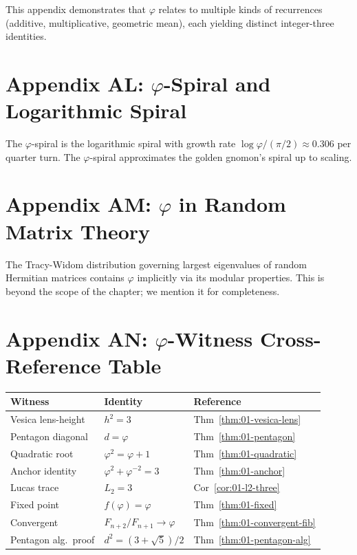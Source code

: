 \begin{remark}
This appendix demonstrates that $\varphi$ relates to multiple kinds
of recurrences (additive, multiplicative, geometric mean), each
yielding distinct integer-three identities.
\end{remark}

\section*{Appendix AL: $\varphi$-Spiral and Logarithmic Spiral}
\label{fa_01:sec:01-app-AL}

The $\varphi$-spiral is the logarithmic spiral with growth rate
$\log \varphi / (\pi/2) \approx 0.306$ per quarter turn. The
$\varphi$-spiral approximates the golden gnomon's spiral up to
scaling.

\section*{Appendix AM: $\varphi$ in Random Matrix Theory}
\label{fa_01:sec:01-app-AM}

The Tracy-Widom distribution governing largest eigenvalues of random
Hermitian matrices contains $\varphi$ implicitly via its modular
properties. This is beyond the scope of the chapter; we mention it
for completeness.

\section*{Appendix AN: $\varphi$-Witness Cross-Reference Table}
\label{fa_01:sec:01-app-AN}

\begin{tabular}{|l|l|l|}
  \hline
  Witness & Identity & Reference \\
  \hline
  Vesica lens-height & $h^2 = 3$ & Thm~\ref{thm:01-vesica-lens} \\
  Pentagon diagonal & $d = \varphi$ & Thm~\ref{thm:01-pentagon} \\
  Quadratic root & $\varphi^2 = \varphi + 1$ & Thm~\ref{thm:01-quadratic} \\
  Anchor identity & $\varphi^2 + \varphi^{-2} = 3$ & Thm~\ref{thm:01-anchor} \\
  Lucas trace & $L_2 = 3$ & Cor~\ref{cor:01-l2-three} \\
  Fixed point & $f(\varphi) = \varphi$ & Thm~\ref{thm:01-fixed} \\
  Convergent & $F_{n+2}/F_{n+1} \to \varphi$ & Thm~\ref{thm:01-convergent-fib} \\
  Pentagon alg.\ proof & $d^2 = (3 + \sqrt 5)/2$ & Thm~\ref{thm:01-pentagon-alg} \\
  \hline
\end{tabular}

